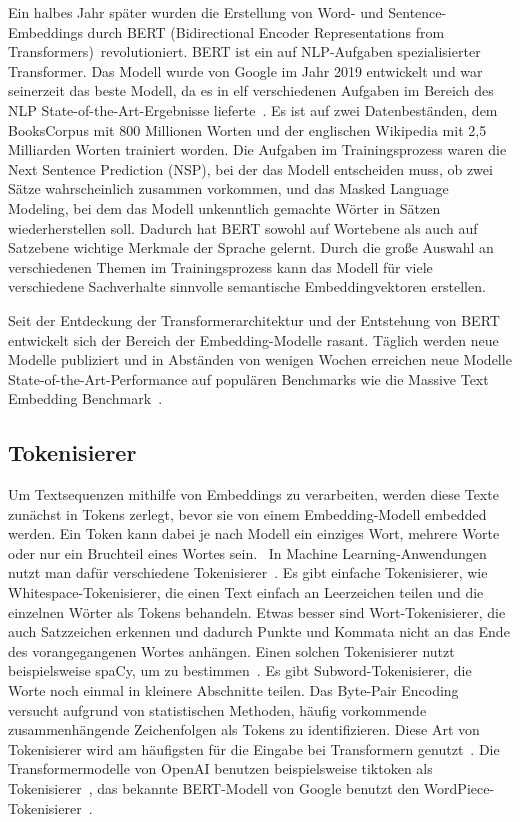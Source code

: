 Ein halbes Jahr später wurden die Erstellung von Word- und Sentence-Embeddings durch BERT (Bidirectional Encoder Representations from Transformers)~\cite{devlin2019}revolutioniert.
BERT ist ein auf NLP-Aufgaben spezialisierter Transformer.
Das Modell wurde von Google im Jahr 2019 entwickelt und war seinerzeit das beste Modell, da es in elf verschiedenen Aufgaben im Bereich des NLP State-of-the-Art-Ergebnisse lieferte~\cite{devlin2019}.
Es ist auf zwei Datenbeständen, dem BooksCorpus mit 800 Millionen Worten und der englischen Wikipedia mit 2,5 Milliarden Worten trainiert worden.
Die Aufgaben im Trainingsprozess waren die Next Sentence Prediction (NSP), bei der das Modell entscheiden muss, ob zwei Sätze wahrscheinlich zusammen vorkommen, und das Masked Language Modeling, bei dem das Modell unkenntlich gemachte Wörter in Sätzen wiederherstellen soll.
Dadurch hat BERT sowohl auf Wortebene als auch auf Satzebene wichtige Merkmale der Sprache gelernt.
Durch die große Auswahl an verschiedenen Themen im Trainingsprozess kann das Modell für viele verschiedene Sachverhalte sinnvolle semantische Embeddingvektoren erstellen.~\cite{devlin2019}

Seit der Entdeckung der Transformerarchitektur und der Entstehung von BERT entwickelt sich der Bereich der Embedding-Modelle rasant.
Täglich werden neue Modelle publiziert und in Abständen von wenigen Wochen erreichen neue Modelle State-of-the-Art-Performance auf populären Benchmarks wie die Massive Text Embedding Benchmark~\cite{muennighoff2023}.

\subsection{Tokenisierer}

Um Textsequenzen mithilfe von Embeddings zu verarbeiten, werden diese Texte zunächst in Tokens zerlegt, bevor sie von einem Embedding-Modell embedded werden.
Ein Token kann dabei je nach Modell ein einziges Wort, mehrere Worte oder nur ein Bruchteil eines Wortes sein.~\cite{he2006}
In Machine Learning-Anwendungen nutzt man dafür verschiedene Tokenisierer~\cite{zouhar2023}.
Es gibt einfache Tokenisierer, wie Whitespace-Tokenisierer, die einen Text einfach an Leerzeichen teilen und die einzelnen Wörter als Tokens behandeln.
Etwas besser sind Wort-Tokenisierer, die auch Satzzeichen erkennen und dadurch Punkte und Kommata nicht an das Ende des vorangegangenen Wortes anhängen.
Einen solchen Tokenisierer nutzt beispielsweise spaCy, um  zu bestimmen~\cite{honnibal2017}.
Es gibt Subword-Tokenisierer, die Worte noch einmal in kleinere Abschnitte teilen.
Das Byte-Pair Encoding versucht aufgrund von statistischen Methoden, häufig vorkommende zusammenhängende Zeichenfolgen als Tokens zu identifizieren.
Diese Art von Tokenisierer wird am häufigsten für die Eingabe bei Transformern genutzt~\cite{zouhar2023}.
Die Transformermodelle von OpenAI benutzen beispielsweise tiktoken als Tokenisierer~\cite{tiktoken2024}, das bekannte BERT-Modell von Google benutzt den WordPiece-Tokenisierer~\cite{devlin2019}.

